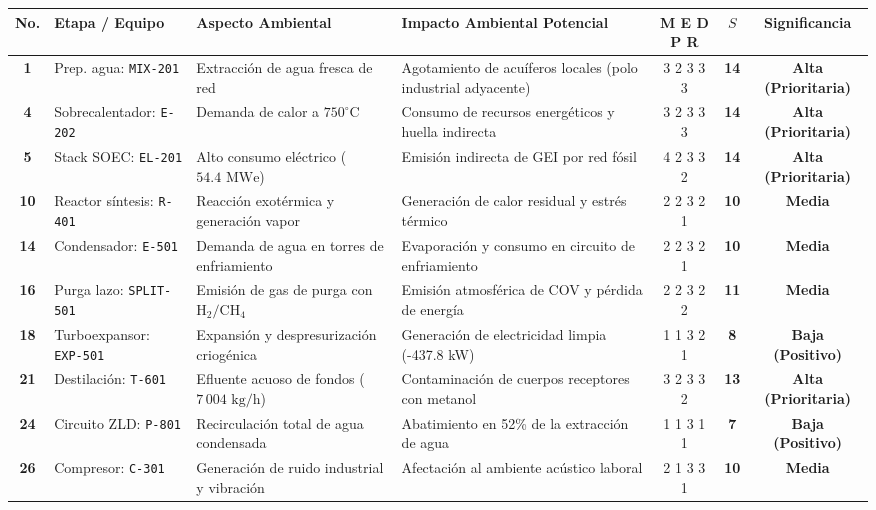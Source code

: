 \documentclass[10pt,landscape]{article}
\newcommand{\badgegreen}[1]{\colorbox{badgegreen}{\textbf{\color{emeraldgreen}\fontsize{6.8pt}{8pt}\selectfont #1}}}
\newcommand{\badgeamber}[1]{\colorbox{badgeamber}{\textbf{\color{amber!90!black}\fontsize{6.8pt}{8pt}\selectfont #1}}}
\newcommand{\badgered}[1]{\colorbox{badgered}{\textbf{\color{darkred}\fontsize{6.8pt}{8pt}\selectfont #1}}}
\begin{document}
\scriptsize
\renewcommand{\arraystretch}{1.14}
\begin{tabularx}{\textwidth}{c p{2.8cm} p{3.4cm} p{3.6cm} c c c}
  \toprule
  \rowcolor{tableheader}
  \textbf{\color{white}No.} & \textbf{\color{white}Etapa / Equipo} & \textbf{\color{white}Aspecto Ambiental} & \textbf{\color{white}Impacto Ambiental Potencial} & \textbf{\color{white}M E D P R} & \textbf{\color{white}$S$} & \textbf{\color{white}Significancia} \\
  \midrule
  \rowcolor{roweven}
  \textbf{1} & Prep. agua: \texttt{MIX-201} & Extracción de agua fresca de red & Agotamiento de acuíferos locales (polo industrial adyacente) & 3 2 3 3 3 & \textbf{14} & \badgered{Alta (Prioritaria)} \\
  \rowcolor{rowodd}
  \textbf{4} & Sobrecalentador: \texttt{E-202} & Demanda de calor a $750^\circ\text{C}$ & Consumo de recursos energéticos y huella indirecta & 3 2 3 3 3 & \textbf{14} & \badgered{Alta (Prioritaria)} \\
  \rowcolor{roweven}
  \textbf{5} & Stack SOEC: \texttt{EL-201} & Alto consumo eléctrico ($54.4\text{ MWe}$) & Emisión indirecta de GEI por red fósil & 4 2 3 3 2 & \textbf{14} & \badgered{Alta (Prioritaria)} \\
  \rowcolor{rowodd}
  \textbf{10} & Reactor síntesis: \texttt{R-401} & Reacción exotérmica y generación vapor & Generación de calor residual y estrés térmico & 2 2 3 2 1 & \textbf{10} & \badgeamber{Media} \\
  \rowcolor{roweven}
  \textbf{14} & Condensador: \texttt{E-501} & Demanda de agua en torres de enfriamiento & Evaporación y consumo en circuito de enfriamiento & 2 2 3 2 1 & \textbf{10} & \badgeamber{Media} \\
  \rowcolor{rowodd}
  \textbf{16} & Purga lazo: \texttt{SPLIT-501} & Emisión de gas de purga con $\text{H}_2/\text{CH}_4$ & Emisión atmosférica de COV y pérdida de energía & 2 2 3 2 2 & \textbf{11} & \badgeamber{Media} \\
  \rowcolor{roweven}
  \textbf{18} & Turboexpansor: \texttt{EXP-501} & Expansión y despresurización criogénica & Generación de electricidad limpia (-437.8 kW) & 1 1 3 2 1 & \textbf{8} & \badgegreen{Baja (Positivo)} \\
  \rowcolor{rowodd}
  \textbf{21} & Destilación: \texttt{T-601} & Efluente acuoso de fondos ($7\,004\text{ kg/h}$) & Contaminación de cuerpos receptores con metanol & 3 2 3 3 2 & \textbf{13} & \badgered{Alta (Prioritaria)} \\
  \rowcolor{roweven}
  \textbf{24} & Circuito ZLD: \texttt{P-801} & Recirculación total de agua condensada & Abatimiento en 52\% de la extracción de agua & 1 1 3 1 1 & \textbf{7} & \badgegreen{Baja (Positivo)} \\
  \rowcolor{rowodd}
  \textbf{26} & Compresor: \texttt{C-301} & Generación de ruido industrial y vibración & Afectación al ambiente acústico laboral & 2 1 3 3 1 & \textbf{10} & \badgeamber{Media} \\
  \bottomrule
\end{tabularx}
\end{document}
